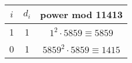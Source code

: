 \begin{center}
\begin{tabular}{c|c|c}
$i$ & $d_i$ & power mod 11413 \\\hline 
1 & 1 & $1^2 \cdot 5859 \equiv 5859$ \\
0 & 1 & $5859^2 \cdot 5859 \equiv 1415$ \\
\end{tabular}
\end{center}

